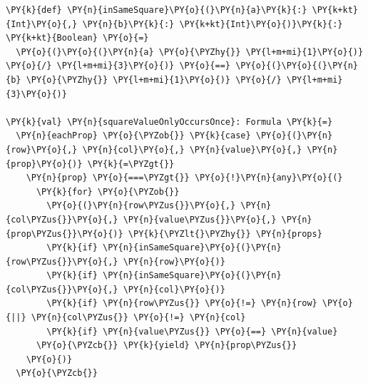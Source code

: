 \documentclass{beamer}
\begin{document}

\begin{frame}[fragile]
\begin{Verbatim}[commandchars=\\\{\}]
\PY{k}{def} \PY{n}{inSameSquare}\PY{o}{(}\PY{n}{a}\PY{k}{:} \PY{k+kt}{Int}\PY{o}{,} \PY{n}{b}\PY{k}{:} \PY{k+kt}{Int}\PY{o}{)}\PY{k}{:} \PY{k+kt}{Boolean} \PY{o}{=}
  \PY{o}{(}\PY{o}{(}\PY{n}{a} \PY{o}{\PYZhy{}} \PY{l+m+mi}{1}\PY{o}{)} \PY{o}{/} \PY{l+m+mi}{3}\PY{o}{)} \PY{o}{==} \PY{o}{(}\PY{o}{(}\PY{n}{b} \PY{o}{\PYZhy{}} \PY{l+m+mi}{1}\PY{o}{)} \PY{o}{/} \PY{l+m+mi}{3}\PY{o}{)}

\PY{k}{val} \PY{n}{squareValueOnlyOccursOnce}: Formula \PY{k}{=}
  \PY{n}{eachProp} \PY{o}{\PYZob{}} \PY{k}{case} \PY{o}{(}\PY{n}{row}\PY{o}{,} \PY{n}{col}\PY{o}{,} \PY{n}{value}\PY{o}{,} \PY{n}{prop}\PY{o}{)} \PY{k}{=\PYZgt{}}
    \PY{n}{prop} \PY{o}{===\PYZgt{}} \PY{o}{!}\PY{n}{any}\PY{o}{(}
      \PY{k}{for} \PY{o}{\PYZob{}}
        \PY{o}{(}\PY{n}{row\PYZus{}}\PY{o}{,} \PY{n}{col\PYZus{}}\PY{o}{,} \PY{n}{value\PYZus{}}\PY{o}{,} \PY{n}{prop\PYZus{}}\PY{o}{)} \PY{k}{\PYZlt{}\PYZhy{}} \PY{n}{props}
        \PY{k}{if} \PY{n}{inSameSquare}\PY{o}{(}\PY{n}{row\PYZus{}}\PY{o}{,} \PY{n}{row}\PY{o}{)}
        \PY{k}{if} \PY{n}{inSameSquare}\PY{o}{(}\PY{n}{col\PYZus{}}\PY{o}{,} \PY{n}{col}\PY{o}{)}
        \PY{k}{if} \PY{n}{row\PYZus{}} \PY{o}{!=} \PY{n}{row} \PY{o}{||} \PY{n}{col\PYZus{}} \PY{o}{!=} \PY{n}{col}
        \PY{k}{if} \PY{n}{value\PYZus{}} \PY{o}{==} \PY{n}{value}
      \PY{o}{\PYZcb{}} \PY{k}{yield} \PY{n}{prop\PYZus{}}
    \PY{o}{)}
  \PY{o}{\PYZcb{}}
\end{Verbatim}
\end{frame}
\end{document}
